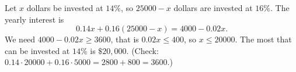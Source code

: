 Let $x$ dollars be invested at $14\%$, so $25000-x$ dollars are invested at $16\%$. The yearly interest is
\[
0.14x+0.16(25000-x)=4000-0.02x .
\]
We need $4000-0.02x\ge3600$, that is $0.02x\le400$, so $x\le20000$. The most that can be invested at $14\%$ is $\boxed{\$20{,}000}$. (Check: $0.14\cdot20000+0.16\cdot5000=2800+800=3600$.)
